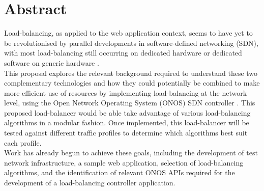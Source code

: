 \section*{Abstract} %
Load-balancing, as applied to the web application context, seems to have yet to be revolutionised by parallel developments in software-defined networking (SDN), with most load-balancing still occurring on dedicated hardware or dedicated software on generic hardware \cite{market_share}. \\

This proposal explores the relevant background required to understand these two complementary technologies and how they could potentially be combined to make more efficient use of resources by implementing load-balancing at the network level, using the Open Network Operating System (ONOS) SDN controller \cite{onos_repo}. This proposed load-balancer would be able take advantage of various load-balancing algorithms in a modular fashion. Once implemented, this load-balancer will be tested against different traffic profiles to determine which algorithms best suit each profile. \\

Work has already begun to achieve these goals, including the development of test network infrastructure, a sample web application, selection of load-balancing algorithms, and the identification of relevant ONOS APIs required for the development of a load-balancing controller application.